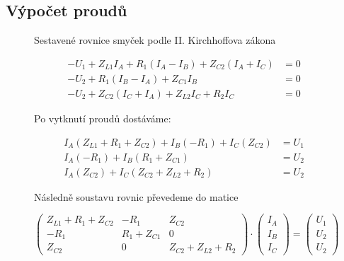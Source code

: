 \subsection{Výpočet proudů}
\begin{figure}[H]
  Sestavené rovnice smyček podle II. Kirchhoffova zákona

  \begin{equation*}
    \begin{aligned}
      -U_1 + Z_{L1} I_A + R_1 (I_A - I_B) + Z_{C2} (I_A + I_C) & = 0 \\
      -U_2 + R_1 (I_B - I_A) + Z_{C1} I_B                      & = 0 \\
      -U_2 + Z_{C2} (I_C + I_A) + Z_{L2} I_C + R_2 I_C         & = 0
    \end{aligned}
  \end{equation*}

  Po vytknutí proudů dostáváme:

  \begin{equation*}
    \begin{aligned}
      I_A (Z_{L1} + R_1 + Z_{C2}) + I_B (-R_1) + I_C (Z_{C2}) & = U_1 \\
      I_A (-R_1) + I_B (R_1 + Z_{C1})                         & = U_2 \\
      I_A (Z_{C2}) + I_C (Z_{C2} + Z_{L2} + R_2)              & = U_2
    \end{aligned}
  \end{equation*}


  Následně soustavu rovnic převedeme do matice

  $$
    \begin{pmatrix}
      Z_{L1}+R_1+Z_{C2} & -R_1       & Z_{C2}            \\
      -R_1              & R_1+Z_{C1} & 0                 \\
      Z_{C2}            & 0          & Z_{C2}+Z_{L2}+R_2
    \end{pmatrix}
    \cdot
    \begin{pmatrix}
      I_A \\
      I_B \\
      I_C
    \end{pmatrix}
    =
    \begin{pmatrix}
      U_1 \\
      U_2 \\
      U_2
    \end{pmatrix}
  $$
\end{figure}

